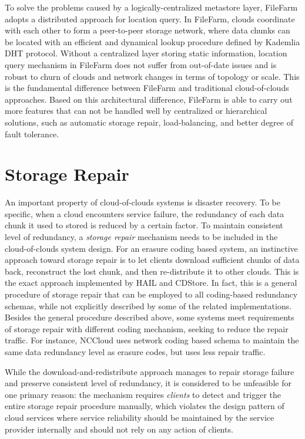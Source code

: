 To solve the problems caused by a logically-centralized metastore layer, FileFarm adopts a distributed approach for location query. In FileFarm, clouds coordinate with each other to form a peer-to-peer storage network, where data chunks can be located with an efficient and dynamical lookup procedure defined by Kademlia\cite{maymounkov2002kademlia} DHT protocol. Without a centralized layer storing static information, location query mechanism in FileFarm does not suffer from out-of-date issues and is robust to churn of clouds and network changes in terms of topology or scale. This is the fundamental difference between FileFarm and traditional cloud-of-clouds approaches. Based on this architectural difference, FileFarm is able to carry out more features that can not be handled well by centralized or hierarchical solutions, such as automatic storage repair, load-balancing, and better degree of fault tolerance.

\section{Storage Repair}
\label{ss:cocstoragerepair}

An important property of cloud-of-clouds systems is disaster recovery. To be specific, when a cloud encounters service failure, the redundancy of each data chunk it used to stored is reduced by a certain factor. To maintain consistent level of redundancy, a \textit{storage repair} mechanism needs to be included in the cloud-of-clouds system design. For an erasure coding based system, an instinctive approach toward storage repair is to let clients download sufficient chunks of data back, reconstruct the lost chunk, and then re-distribute it to other clouds. This is the exact approach implemented by HAIL\cite{bowers2009hail} and CDStore\cite{li2015cdstore}. In fact, this is a general procedure of storage repair that can be employed to all coding-based redundancy schemas, while not explicitly described by some of the related implementations. Besides the general procedure described above, some systems meet requirements of storage repair with different coding mechanism, seeking to reduce the repair traffic. For instance, NCCloud\cite{hu2012nccloud} uses network coding based schema to maintain the same data redundancy level as erasure codes, but uses less repair traffic.

While the download-and-redistribute approach manages to repair storage failure and preserve consistent level of redundancy, it is considered to be unfeasible for one primary reason: the mechanism requires \textit{clients} to detect and trigger the entire storage repair procedure manually, which violates the design pattern of cloud services where service reliability should be maintained by the service provider internally and should not rely on any action of clients.


